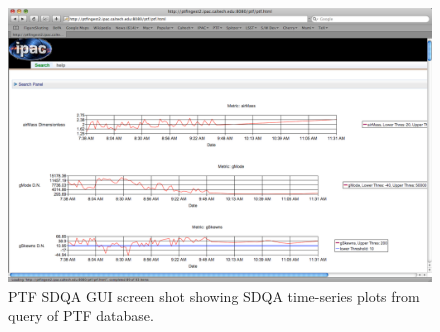 \begin{figure}[htbp]
\begin{centering}
\includegraphics[width=5in]{images/PTFSDQSGUI2}
\caption{PTF SDQA GUI screen shot showing SDQA time-series plots from query of PTF database.} 
 \label{PTFSDQAGUI2}
\end{centering}
\end{figure}
